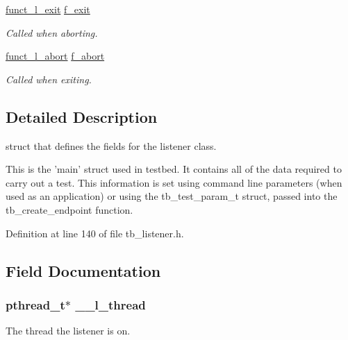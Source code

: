 \begin{DoxyCompactItemize}
\hyperlink{tb__listener_8h_a087aa7eae6394f6a052ea86a8944b262}{funct\-\_\-l\-\_\-exit} \hyperlink{structtb__listener__t_a90a87c6e5bc8d9e690190da6d0aa926e}{f\-\_\-exit}
\begin{DoxyCompactList}\small\item\em Called when aborting. \end{DoxyCompactList}\item 
\hyperlink{tb__listener_8h_a26990e2906e18234aa32e757383e1752}{funct\-\_\-l\-\_\-abort} \hyperlink{structtb__listener__t_a385e4cbcf683dd35d7d80c9726c8c67d}{f\-\_\-abort}
\begin{DoxyCompactList}\small\item\em Called when exiting. \end{DoxyCompactList}\end{DoxyCompactItemize}


\subsection{Detailed Description}
struct that defines the fields for the listener class. 

This is the 'main' struct used in testbed. It contains all of the data required to carry out a test. This information is set using command line parameters (when used as an application) or using the tb\-\_\-test\-\_\-param\-\_\-t struct, passed into the tb\-\_\-create\-\_\-endpoint function. 

Definition at line 140 of file tb\-\_\-listener.\-h.



\subsection{Field Documentation}
\hypertarget{structtb__listener__t_a104cf2a79e8cb03fe3c0d3301fe8257f}{
\subsubsection[{\-\_\-\-\_\-l\-\_\-thread}]{\setlength{\rightskip}{0pt plus 5cm}pthread\-\_\-t$\ast$ \-\_\-\-\_\-l\-\_\-thread}}\label{structtb__listener__t_a104cf2a79e8cb03fe3c0d3301fe8257f}


The thread the listener is on. 




